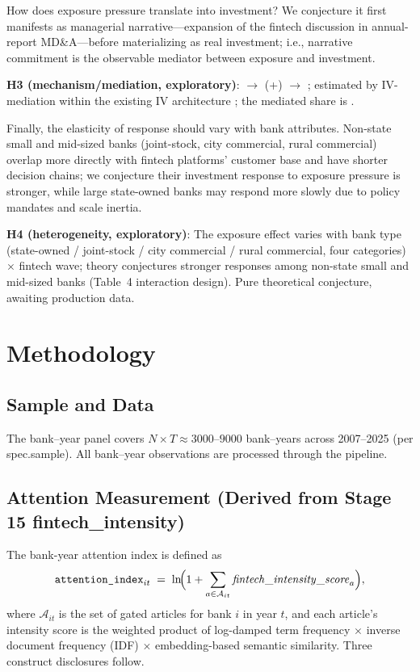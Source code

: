How does exposure pressure translate into investment? We conjecture it first
manifests as managerial narrative---expansion of the fintech discussion in
annual-report MD\&A---before materializing as real investment; i.e., narrative
commitment is the observable mediator between exposure and investment.

\textbf{H3 (mechanism/mediation, exploratory)}: 
$\to$  (+) $\to$
; estimated by IV-mediation within the existing
IV architecture \parencite{dippel2020ivmediate}; the mediated share is
.

Finally, the elasticity of response should vary with bank attributes.
Non-state small and mid-sized banks (joint-stock, city commercial, rural
commercial) overlap more directly with fintech platforms' customer base and
have shorter decision chains; we conjecture their investment response to
exposure pressure is stronger, while large state-owned banks may respond more
slowly due to policy mandates and scale inertia.

\textbf{H4 (heterogeneity, exploratory)}: The exposure effect varies with bank
type (state-owned / joint-stock / city commercial / rural commercial, four
categories) $\times$ fintech wave; theory conjectures stronger responses among
non-state small and mid-sized banks (Table~4 interaction design). Pure
theoretical conjecture, awaiting production data.

\section{Methodology}\label{sec:method}
\subsection{Sample and Data}
The bank--year panel covers $N \times T \approx 3000\text{--}9000$ bank--years
across 2007--2025 (per spec.sample). All bank--year observations are processed
through the  pipeline.

\subsection{Attention Measurement (Derived from Stage 15 fintech\_intensity)}\label{subsec:attention}
The bank-year attention index is defined as
\begin{equation}\label{eq:attn}
\texttt{attention\_index}_{it} \;=\; \ln\!\Bigl(1 + \sum_{a \in \mathcal{A}_{it}}
\mathit{fintech\_intensity\_score}_a\Bigr),
\end{equation}
where $\mathcal{A}_{it}$ is the set of gated articles for bank $i$ in year
$t$, and each article's intensity score is the weighted product of log-damped
term frequency $\times$ inverse document frequency (IDF) $\times$
embedding-based semantic similarity. Three construct disclosures follow.

